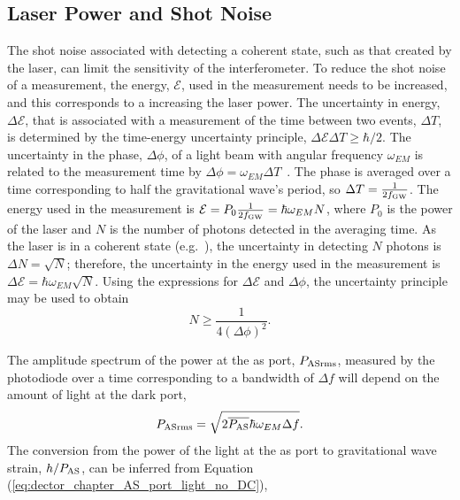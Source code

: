 \subsection{Laser Power and Shot Noise}
\label{sec:detector_chapter_shot_noise}
The shot noise associated with detecting a coherent state, such as that created by the laser, can limit the sensitivity of the interferometer. To reduce the shot noise of a measurement, the energy, $\mathcal{E}$, used in the measurement needs to be increased, and this corresponds to a increasing the laser power. The uncertainty in energy, $\Delta \mathcal{E}$, that is associated with a measurement of the time between two events, $\Delta T$, is determined by the time-energy uncertainty principle, $\Delta \mathcal{E} \Delta T\geq \hbar/2$. The uncertainty in the phase, $\Delta \phi$, of a light beam with angular frequency $\omega_{EM}$ is related to the measurement time by $\Delta \phi = \omega_{EM} \Delta T$~\cite{Braginsky2000}. The phase is averaged over a time corresponding to half the gravitational wave's period, so $\Delta T = \frac{1}{2f_{\rm{GW}}}$. The energy used in the measurement is $\mathcal{E} = P_0\frac{1}{2f_{\rm{GW}}} = \hbar\omega_{EM}N$, where $P_0$ is the power of the laser and $N$ is the number of photons detected in the averaging time. As the laser is in a coherent state (e.g.~\cite{Caves1981,Danilishin2012}), the uncertainty in detecting $N$ photons is $\Delta N = \sqrt{N}$; therefore, the uncertainty in the energy used in the measurement is $\Delta \mathcal{E} = \hbar\omega_{EM}\sqrt{N}$. Using the expressions for $\Delta \mathcal{E}$ and $\Delta \phi$, the uncertainty principle may be used to obtain
\begin{equation}
N \geq \frac{1}{4 (\Delta \phi)^2}.
\label{eq:phase_photon_number_relation}
\end{equation}
\par
The amplitude spectrum of the power at the \gls{as} port, $P_{\rm{AS rms}}$, measured by the photodiode over a time corresponding to a bandwidth of $\Delta f$ will depend on the amount of light at the dark port,
\begin{equation}
P_{\rm{AS rms}} = \sqrt{2\overline{P_{\rm{AS}}}\hbar\omega_{EM}\Delta f}.
\end{equation}
The conversion from the power of the light at the \gls{as} port to gravitational wave strain, $h/P_{\rm{AS}}$, can be inferred from Equation (\ref{eq:dector_chapter_AS_port_light_no_DC}),
